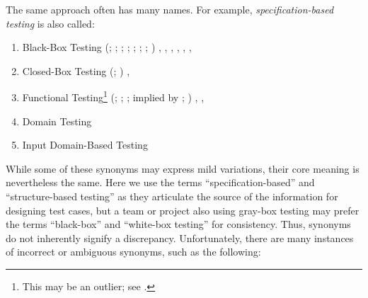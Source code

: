 The same approach often has many names. For example,
\emph{specification-based testing} is also called:
\begin{enumerate}
    \item Black-Box Testing
          \ifnotpaper
              (\citealp[p.~9]{IEEE2022}; \citeyear[p.~8]{IEEE2021};
              \citeyear[p.~431]{IEEE2017}; \citealp[p.~5-10]{SWEBOK2024};
              \citealpISTQB{}; \citealp[p.~46 (without hyphen)]{Firesmith2015};
              \citealp[p.~344]{SakamotoEtAl2013}; \citealp[p.~399]{vanVliet2000})
          \else
              \cite[p.~431]{IEEE2017}, \cite{ISTQB}, \cite[p.~5-10]{SWEBOK2024},
              \cite[p.~9]{IEEE2022}, \cite[p.~399]{vanVliet2000},
              \cite[p.~8]{IEEE2021}, %
              \cite[p.~344]{SakamotoEtAl2013}
          \fi
    \item Closed-Box Testing
          \ifnotpaper
              (\citealp[p.~9]{IEEE2022}; \citeyear[p.~431]{IEEE2017})
          \else
              \cite[p.~431]{IEEE2017}, \cite[p.~9]{IEEE2022}
          \fi
    \item Functional Testing\footnote{This may be an outlier; see
              .}
          \ifnotpaper
              (\citealp[p.~196]{IEEE2017}; \citealp[p.~44]{Kam2008};
              \citealp[p.~399]{vanVliet2000}; implied by \citealp[p.~129]{IEEE2021};
              \citeyear[p.~431]{IEEE2017})
          \else
              \cite[p.~196]{IEEE2017}, \cite[p.~399]{vanVliet2000},
              \cite[p.~44]{Kam2008}
          \fi
    \item Domain Testing \citep[p.~5-10]{SWEBOK2024}
          \ifnotpaper
    \item Input Domain-Based Testing \citetext{implied by
              \citealp[p.~4-8]{SWEBOK2014}}
          \fi
\end{enumerate}

While some of these synonyms may express mild variations, their core meaning
is nevertheless the same. Here we use the terms ``specification-based'' and
``structure-based testing'' as they articulate the source of the information
for designing test cases, but a team or project also using gray-box testing may
prefer the terms ``black-box'' and ``white-box testing'' for consistency.
Thus, synonyms do not inherently signify a discrepancy. Unfortunately, there
are many instances of incorrect or ambiguous synonyms, such as the following:



